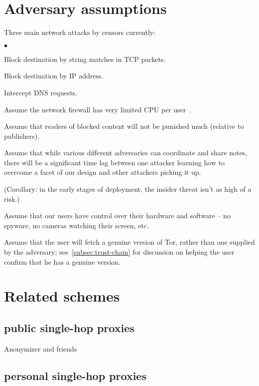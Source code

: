 \documentclass{llncs}
\newenvironment{tightlist}{\begin{list}{$\bullet$}{
  \setlength{\itemsep}{0mm}
    \setlength{\parsep}{0mm}
    }}{\end{list}}
\begin{document}
\section{Adversary assumptions}
\label{sec:adversary}

Three main network attacks by censors currently:

\begin{tightlist}
\item Block destination by string matches in TCP packets.

\item Block destination by IP address.

\item Intercept DNS requests.
\end{tightlist}

Assume the network firewall has very limited CPU per
user~\cite{clayton-pet2006}.

Assume that readers of blocked content will not be punished much
(relative to publishers).

Assume that while various different adversaries can coordinate and share
notes, there will be a significant time lag between one attacker learning
how to overcome a facet of our design and other attackers picking it up.

(Corollary: in the early stages of deployment, the insider threat isn't
as high of a risk.)

Assume that our users have control over their hardware and software -- no
spyware, no cameras watching their screen, etc.

Assume that the user will fetch a genuine version of Tor, rather than
one supplied by the adversary; see~\ref{subsec:trust-chain} for discussion
on helping the user confirm that he has a genuine version.

\section{Related schemes}

\subsection{public single-hop proxies}

Anonymizer and friends

\subsection{personal single-hop proxies}
\end{document}
